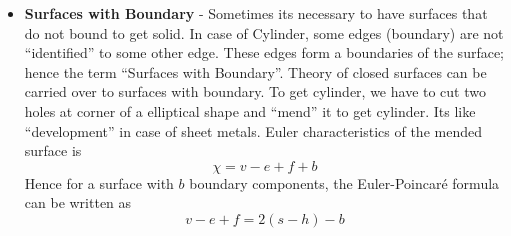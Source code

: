 \documentclass[12pt,a4paper,openbib]{article}
\begin{document}
\begin{itemize}
	\item {\bf Surfaces with Boundary} - Sometimes its necessary to have 
		surfaces that do not bound to get solid.  In case of Cylinder, some
		edges (boundary) are not ``identified'' to some other edge. These edges
		form a boundaries of the surface; hence the term ``Surfaces with 
		Boundary''. Theory of closed surfaces can be carried over to surfaces
		with boundary. To get cylinder, we have to cut two holes at corner
		of a elliptical shape and ``mend'' it to get cylinder. Its like
		``development'' in case of sheet metals. Euler characteristics of the
		mended surface is
		\begin{equation}
			\chi = v - e +f + b
		\end{equation}
		Hence for a surface with $b$ boundary components, the Euler-Poincar\'{e}
		formula can be written as
		\begin{equation}
		 	v -e +f = 2(s -h) - b
		\end{equation}
\end{itemize}
\end{document}
